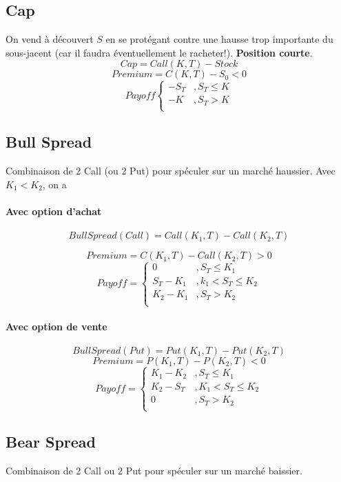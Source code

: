 \documentclass[10pt, french]{article}
\begin{document}
\begin{multicols*}{2}
\subsection*{Cap}
On vend à découvert $S$ en se protégant contre une hausse trop importante du sous-jacent (car il faudra éventuellement le racheter!). \textbf{Position courte}.
\[Cap = Call(K,T) - Stock\]
\[Premium = C(K,T) - S_0 < 0\]
\[Payoff
\begin{cases}
- S_T 			& , S_T \leq K \\
- K				& , S_T > K \\
\end{cases}
\]


\subsection*{Bull Spread}
Combinaison de 2 Call (ou 2 Put) pour spéculer sur un marché haussier. Avec $K_1 < K_2$, on a
\paragraph{Avec option d'achat}
\[Bull Spread (Call) = Call(K_1, T) - Call(K_2, T) \]

\[Premium = C(K_1, T) - Call(K_2, T) > 0 \]
\[Payoff =
\begin{cases}
0					& , S_T \leq K_1 \\
S_T - K_1		& , k_1 < S_T \leq K_2 \\
K_2 -K_1		& , S_T > K_2 \\
\end{cases}
\]
\paragraph{Avec option de vente}
\[Bull Spread(Put) = Put(K_1, T) - Put(K_2,T) \]
\[Premium = P(K_1,T) - P(K_2, T) < 0\]
\[Payoff =
\begin{cases}
K_1 - K_2 			& , S_T \leq K_1 \\
K_2 - S_T				& , K_1 < S_T \leq K_2 \\
0							& , S_T > K_2 \\
\end{cases}
\]




\subsection*{Bear Spread}
Combinaison de 2 Call ou 2 Put pour spéculer sur un marché baissier.

\end{multicols*}
\end{document}
